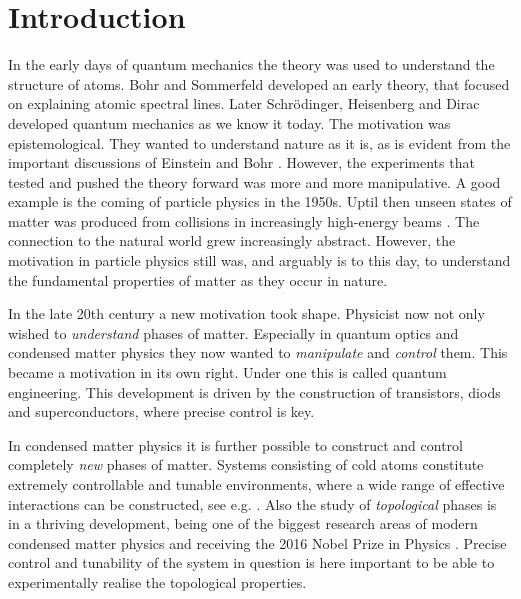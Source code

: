 
\chapter{Introduction} %

\label{Chapter1} %


In the early days of quantum mechanics the theory was used to understand the structure of atoms. Bohr and Sommerfeld developed an early theory, that focused on explaining atomic spectral lines. Later Schr{\"o}dinger, Heisenberg and Dirac developed quantum mechanics as we know it today. The motivation was epistemological. They wanted to understand nature as it is, as is evident from the important discussions of Einstein and Bohr \cite{EinsteinEPRparadox, BohrEPRparadox}. However, the experiments that tested and pushed the theory forward was more and more manipulative. A good example is the coming of particle physics in the 1950s. Uptil then unseen states of matter was produced from collisions in increasingly high-energy beams \cite{Martin.NuclearAndParticlePhysics}. The connection to the natural world grew increasingly abstract. However, the motivation in particle physics still was, and arguably is to this day, to understand the fundamental properties of matter as they occur in nature. 

In the late 20th century a new motivation took shape. Physicist now not only wished to \textit{understand} phases of matter. Especially in quantum optics and condensed matter physics they now wanted to \textit{manipulate} and \textit{control} them. This became a motivation in its own right. Under one this is called quantum engineering. This development is driven by the construction of transistors, diods and superconductors, where precise control is key. 

In condensed matter physics it is further possible to construct and control completely \textit{new} phases of matter. Systems consisting of cold atoms constitute extremely controllable and tunable environments, where a wide range of effective interactions can be constructed, see e.g. \cite{Pohl.supersolidity, BruunZhigangTopSuperfluid}. Also the study of \textit{topological} phases is in a thriving development, being one of the biggest research areas of modern condensed matter physics and receiving the 2016 Nobel Prize in Physics \cite{NobelPrize2016}. Precise control and tunability of the system in question is here important to be able to experimentally realise the topological properties. 

